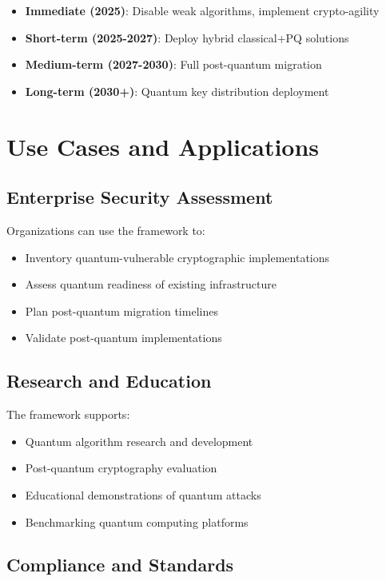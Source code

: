 \documentclass[11pt]{article}
\begin{document}
\begin{itemize}
\item \textbf{Immediate (2025)}: Disable weak algorithms, implement crypto-agility
\item \textbf{Short-term (2025-2027)}: Deploy hybrid classical+PQ solutions
\item \textbf{Medium-term (2027-2030)}: Full post-quantum migration
\item \textbf{Long-term (2030+)}: Quantum key distribution deployment
\end{itemize}

\section{Use Cases and Applications}

\subsection{Enterprise Security Assessment}

Organizations can use the framework to:
\begin{itemize}
\item Inventory quantum-vulnerable cryptographic implementations
\item Assess quantum readiness of existing infrastructure
\item Plan post-quantum migration timelines
\item Validate post-quantum implementations
\end{itemize}

\subsection{Research and Education}

The framework supports:
\begin{itemize}
\item Quantum algorithm research and development
\item Post-quantum cryptography evaluation
\item Educational demonstrations of quantum attacks
\item Benchmarking quantum computing platforms
\end{itemize}

\subsection{Compliance and Standards}
\end{document}
